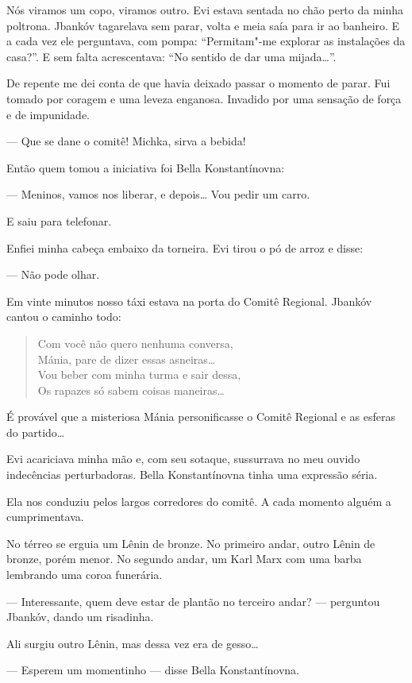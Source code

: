 Nós viramos um copo, viramos outro. Evi estava sentada no chão perto da
minha poltrona. Jbankóv tagarelava sem parar, volta e meia saía para ir
ao banheiro. E a cada vez ele perguntava, com pompa: ``Permitam"-me
explorar as instalações da casa?''. E sem falta acrescentava: ``No
sentido de dar uma mijada\ldots{}''.

De repente me dei conta de que havia deixado passar o momento de parar.
Fui tomado por coragem e uma leveza enganosa. Invadido por uma sensação
de força e de impunidade.

--- Que se dane o comitê! Michka, sirva a bebida!

Então quem tomou a iniciativa foi Bella Konstantínovna:

--- Meninos, vamos nos liberar, e depois\ldots{} Vou pedir um carro.

E saiu para telefonar.

Enfiei minha cabeça embaixo da torneira. Evi tirou o pó de arroz e
disse:

--- Não pode olhar.

Em vinte minutos nosso táxi estava na porta do Comitê Regional. Jbankóv
cantou o caminho todo:

\begin{verse}
Com você não quero nenhuma conversa,\\
Mánia, pare de dizer essas asneiras\ldots{}\\
Vou beber com minha turma e sair dessa,\\
Os rapazes só sabem coisas maneiras\ldots{}
\end{verse}

É provável que a misteriosa Mánia personificasse o Comitê Regional e as
esferas do partido\ldots{}

Evi acariciava minha mão e, com seu sotaque, sussurrava no meu ouvido
indecências perturbadoras. Bella Konstantínovna tinha uma expressão
séria.

Ela nos conduziu pelos largos corredores do comitê. A cada momento
alguém a cumprimentava.

No térreo se erguia um Lênin de bronze. No primeiro andar, outro Lênin
de bronze, porém menor. No segundo andar, um Karl Marx com uma barba
lembrando uma coroa funerária.

--- Interessante, quem deve estar de plantão no terceiro andar?
--- perguntou Jbankóv, dando um risadinha.

Ali surgiu outro Lênin, mas dessa vez era de gesso\ldots{}

--- Esperem um momentinho --- disse Bella Konstantínovna.

